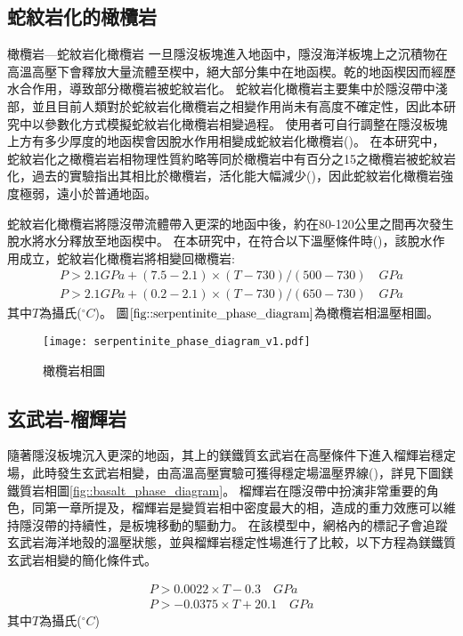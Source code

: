 \subsection{蛇紋岩化的橄欖岩}
橄欖岩---蛇紋岩化橄欖岩
一旦隱沒板塊進入地函中，隱沒海洋板塊上之沉積物在高溫高壓下會釋放大量流體至楔中，絕大部分集中在地函楔。乾的地函楔因而經歷水合作用，導致部分橄欖岩被蛇紋岩化。
蛇紋岩化橄欖岩主要集中於隱沒帶中淺部，並且目前人類對於蛇紋岩化橄欖岩之相變作用尚未有高度不確定性，因此本研究中以參數化方式模擬蛇紋岩化橄欖岩相變過程。
使用者可自行調整在隱沒板塊上方有多少厚度的地函楔會因脫水作用相變成蛇紋岩化橄欖岩(\citealp{Tan2012})。
在本研究中，蛇紋岩化之橄欖岩岩相物理性質約略等同於橄欖岩中有百分之15之橄欖岩被蛇紋岩化，過去的實驗指出其相比於橄欖岩，活化能大幅減少(\citealp{hilairet2007high})，因此蛇紋岩化橄欖岩強度極弱，遠小於普通地函。

蛇紋岩化橄欖岩將隱沒帶流體帶入更深的地函中後，約在80-120公里之間再次發生脫水將水分釋放至地函楔中。
在本研究中，在符合以下溫壓條件時(\citealp{Ulmer1995})，該脫水作用成立，蛇紋岩化橄欖岩將相變回橄欖岩:
\begin{align}
P > 2.1 GPa + (7.5-2.1)\times (T-730)/(500-730) \quad GPa \\
P > 2.1 GPa + (0.2-2.1) \times (T-730)/(650-730) \quad GPa
\end{align}
其中$T$為攝氏($^\circ C$)。
圖$\ref{fig::serpentinite_phase_diagram}$為橄欖岩相溫壓相圖。

\begin{figure*}[ht!]
    \centering
    \texttt{[image: serpentinite\_phase\_diagram\_v1.pdf]}
    \caption[橄欖岩相圖]{橄欖岩相圖}
    \label{fig::serpentinite_phase_diagram}
\end{figure*}

\subsection{玄武岩-榴輝岩}

隨著隱沒板塊沉入更深的地函，其上的鎂鐵質玄武岩在高壓條件下進入榴輝岩穩定場，此時發生玄武岩相變，由高溫高壓實驗可獲得穩定場溫壓界線(\citealp{Hacker2003})，詳見下圖鎂鐵質岩相圖\ref{fig::basalt_phase_diagram}。
榴輝岩在隱沒帶中扮演非常重要的角色，同第一章所提及，榴輝岩是變質岩相中密度最大的相，造成的重力效應可以維持隱沒帶的持續性，是板塊移動的驅動力。
在該模型中，網格內的標記子會追蹤玄武岩海洋地殼的溫壓狀態，並與榴輝岩穩定性場進行了比較，以下方程為鎂鐵質玄武岩相變的簡化條件式。

\begin{align}
    P > 0.0022 \times T -0.3  \quad GPa\\
    P > -0.0375 \times T + 20.1  \quad GPa
\end{align}
其中$T$為攝氏($^\circ C$)

